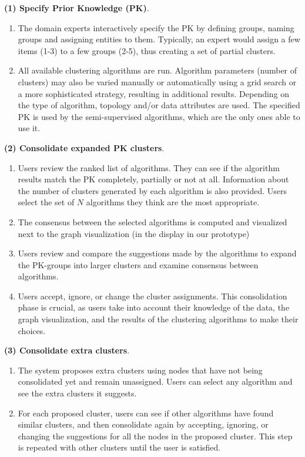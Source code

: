 \noindent \textbf{(1) Specify Prior Knowledge (PK)}.
\begin{enumerate}[left=.3em,nosep,label={\arabic*}.]
\item The domain experts interactively specify the PK by defining  groups, \ie naming groups and assigning entities to them.
Typically, an expert would assign a few items (1-3) to a few groups (2-5), thus creating a set of partial clusters.
\item All available clustering algorithms are run. Algorithm parameters (\eg number of clusters) may also be varied manually or automatically using a grid search or a more sophisticated strategy, resulting in additional results. Depending on the type of algorithm, topology and/or data attributes are used. The specified PK is used by the semi-supervised algorithms, which are the only ones able to use it.
\end{enumerate}

\noindent \textbf{(2) Consolidate expanded PK clusters}.
\begin{enumerate}[left=.3em,nosep,label={\arabic*}.,start=3]
\item Users review the ranked list of algorithms. They can see if the algorithm results match the PK completely, partially or not at all. Information about the number of clusters generated by each algorithm is also provided.  Users select the set of $N$ algorithms they think are the most appropriate.
\item The consensus between the selected algorithms is computed and visualized next to the graph visualization  (in the \paovis display in our prototype)
\item Users review and compare the suggestions made by the algorithms to expand the PK-groups into larger clusters and examine consensus between algorithms.
\item Users accept, ignore, or change the cluster assignments. This consolidation phase is crucial, as users take into account their knowledge of the data, the graph visualization, and the results of the clustering algorithms to make their choices.
\end{enumerate}

\noindent \textbf{(3) Consolidate extra clusters}.
\begin{enumerate}[left=.3em,nosep,label={\arabic*}.,start=7,itemindent=0pt]
\item The system proposes extra clusters using nodes that have not being consolidated yet and remain unassigned. Users can select any algorithm and see the extra clusters it suggests.
\item For each proposed cluster, users can see if other algorithms have found similar clusters, and then consolidate again by accepting, ignoring, or changing the suggestions for all the nodes in the proposed cluster.  This step is repeated with other clusters until the user is satisfied.
\end{enumerate}

